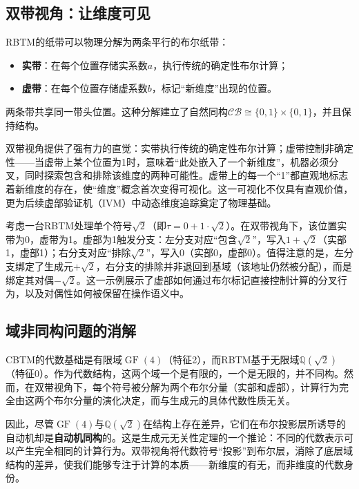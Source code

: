 \documentclass{ctexart}
\begin{document}
	\subsection{双带视角：让维度可见}
	
	RBTM的纸带可以物理分解为两条平行的布尔纸带：
	\begin{itemize}
		\item \textbf{实带}：在每个位置存储实系数$a$，执行传统的确定性布尔计算；
		\item \textbf{虚带}：在每个位置存储虚系数$b$，标记``新维度''出现的位置。
	\end{itemize}
	两条带共享同一带头位置。这种分解建立了自然同构$\mathcal{CB}\cong\{0,1\}\times\{0,1\}$，并且保持结构。
	
	双带视角提供了强有力的直觉：实带执行传统的确定性布尔计算；虚带控制非确定性——当虚带上某个位置为1时，意味着``此处嵌入了一个新维度''，机器必须分叉，同时探索包含和排除该维度的两种可能性。虚带上的每一个``1''都直观地标志着新维度的存在，使``维度''概念首次变得可视化。这一可视化不仅具有直观价值，更为后续虚部验证机（IVM）中动态维度追踪奠定了物理基础。
	
	考虑一台RBTM处理单个符号$\sqrt{2}$（即$\tau=0+1\cdot\sqrt{2}$）。在双带视角下，该位置实带为0，虚带为1。虚部为1触发分支：左分支对应``包含$\sqrt{2}$''，写入$1+\sqrt{2}$（实部1，虚部1）；右分支对应``排除$\sqrt{2}$''，写入$0$（实部0，虚部0）。值得注意的是，左分支绑定了生成元$+\sqrt{2}$，右分支的排除并非退回到基域（该地址仍然被分配），而是绑定其对偶$-\sqrt{2}$。这一示例展示了虚部如何通过布尔标记直接控制计算的分叉行为，以及对偶性如何被保留在操作语义中。
	
	\subsection{域非同构问题的消解}
	
	CBTM的代数基础是有限域$\operatorname{GF}(4)$（特征2），而RBTM基于无限域$\mathbb{Q}(\sqrt{2})$（特征0）。作为代数结构，这两个域一个是有限的，一个是无限的，并不同构。然而，在双带视角下，每个符号被分解为两个布尔分量（实部和虚部），计算行为完全由这两个布尔分量的演化决定，而与生成元的具体代数性质无关。
	
	因此，尽管$\operatorname{GF}(4)$与$\mathbb{Q}(\sqrt{2})$在结构上存在差异，它们在布尔投影层所诱导的自动机却是\textbf{自动机同构}的。这是生成元无关性定理的一个推论：不同的代数表示可以产生完全相同的计算行为。双带视角将代数符号``投影''到布尔层，消除了底层域结构的差异，使我们能够专注于计算的本质——新维度的有无，而非维度的代数身份。
	
\end{document}
